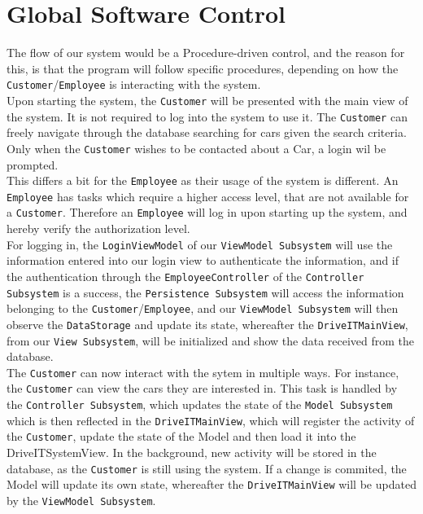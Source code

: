 \section{Global Software Control}

The flow of our system would be a Procedure-driven control, and the reason for this, is that the program will follow specific procedures, depending on how the \texttt{Customer}/\texttt{Employee} is interacting with the system.\\

Upon starting the system, the \texttt{Customer} will be presented with the main view of the system. It is not required to log into the system to use it. The \texttt{Customer} can freely navigate through the database searching for cars given the search criteria. Only when the \texttt{Customer} wishes to be contacted about a Car, a login wil be prompted.\\ 

This differs a bit for the \texttt{Employee} as their usage of the system is different. An \texttt{Employee} has tasks which require a higher access level, that are not available for a \texttt{Customer}. Therefore an \texttt{Employee} will log in upon starting up the system, and hereby verify the authorization level.\\

For logging in, the \texttt{LoginViewModel} of our \texttt{ViewModel Subsystem} will use the information entered into our login view to authenticate the information, and if the authentication through the \texttt{EmployeeController} of the \texttt{Controller Subsystem} is a success, the \texttt{Persistence Subsystem} will access the information belonging to the \texttt{Customer}/\texttt{Employee}, and our \texttt{ViewModel Subsystem} will then observe the \texttt{DataStorage} and update its state, whereafter the \texttt{DriveITMainView}, from our \texttt{View Subsystem}, will be initialized and show the data received from the database.\\

The \texttt{Customer} can now interact with the sytem in multiple ways. For instance, the \texttt{Customer} can view the cars they are interested in. This task is handled by the \texttt{Controller Subsystem}, which updates the state of the \texttt{Model Subsystem} which is then reflected in the \texttt{DriveITMainView}, which will register the activity of the \texttt{Customer}, update the state of the Model and then load it into the DriveITSystemView. In the background, new activity will be stored in the database, as the \texttt{Customer} is still using the system. If a change is commited, the Model will update its own state, whereafter the \texttt{DriveITMainView} will be updated by the \texttt{ViewModel Subsystem}.\\

